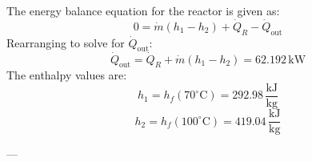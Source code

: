 The energy balance equation for the reactor is given as:  
\[
0 = \dot{m} \left( h_1 - h_2 \right) + \dot{Q}_R - \dot{Q}_{\text{out}}
\]  
Rearranging to solve for \( \dot{Q}_{\text{out}} \):  
\[
\dot{Q}_{\text{out}} = \dot{Q}_R + \dot{m} \left( h_1 - h_2 \right) = 62.192 \, \text{kW}
\]  
The enthalpy values are:  
\[
h_1 = h_f \left( 70^\circ \text{C} \right) = 292.98 \, \frac{\text{kJ}}{\text{kg}}
\]  
\[
h_2 = h_f \left( 100^\circ \text{C} \right) = 419.04 \, \frac{\text{kJ}}{\text{kg}}
\]  

---